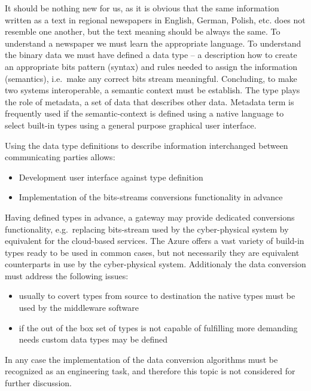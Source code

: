 \documentclass[
]{article}
\providecommand{\tightlist}{%
  \setlength{\itemsep}{0pt}\setlength{\parskip}{0pt}}
\begin{document}
It should be nothing new for us, as it is obvious that the same
information written as a text in regional newspapers in English, German,
Polish, etc. does not resemble one another, but the text meaning should
be always the same. To understand a newspaper we must learn the
appropriate language. To understand the binary data we must have defined
a data type -- a description how to create an appropriate bits pattern
(syntax) and rules needed to assign the information (semantics),
i.e.~make any correct bits stream meaningful. Concluding, to make two
systems interoperable, a semantic context must be establish. The type
plays the role of metadata, a set of data that describes other data.
Metadata term is frequently used if the semantic-context is defined
using a native language to select built-in types using a general purpose
graphical user interface.

Using the data type definitions to describe information interchanged
between communicating parties allows:

\begin{itemize}
\tightlist
\item
  Development user interface against type definition
\item
  Implementation of the bits-streams conversions functionality in
  advance
\end{itemize}

Having defined types in advance, a gateway may provide dedicated
conversions functionality, e.g.~replacing bits-stream used by the
cyber-physical system by equivalent for the cloud-based services. The
Azure offers a vast variety of build-in types ready to be used in common
cases, but not necessarily they are equivalent counterparts in use by
the cyber-physical system. Additionaly the data conversion must address
the following issues:

\begin{itemize}
\tightlist
\item
  usually to covert types from source to destination the native types
  must be used by the middleware software
\item
  if the out of the box set of types is not capable of fulfilling more
  demanding needs custom data types may be defined
\end{itemize}

In any case the implementation of the data conversion algorithms must be
recognized as an engineering task, and therefore this topic is not
considered for further discussion.
\end{document}
